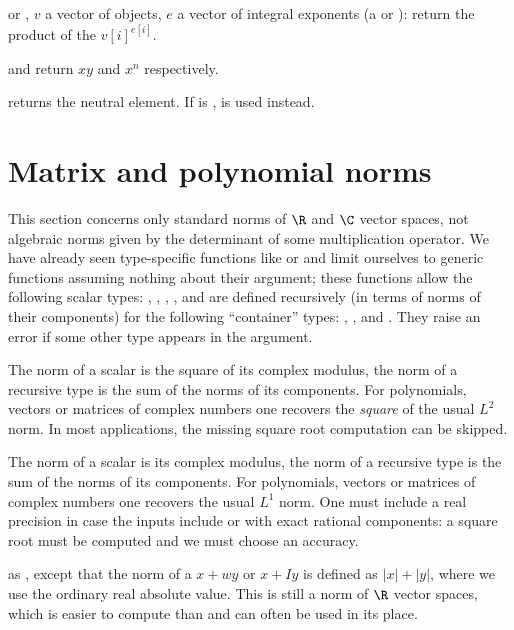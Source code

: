 \item or \kbd{[v, e]},  $v$ a vector of objects, $e$ a vector of integral
exponents (a  or ): return the product of the $v[i]^{e[i]}$.

\noindent {} and 
return $xy$ and $x^n$ respectively.

\noindent {} returns the neutral element. If  is ,
 is used instead.

\section{Matrix and polynomial norms} This section concerns only standard norms
of $\R$ and $\C$ vector spaces, not algebraic norms given by the determinant of
some multiplication operator. We have already seen type-specific functions like
 or  and limit ourselves to generic functions
assuming nothing about their  argument; these functions allow
the following scalar types: , , , ,
 and are defined recursively (in terms of norms of their components)
for the following ``container'' types: , ,  and
. They raise an error if some other type appears in the argument.

 The norm of a scalar is the square of its complex
modulus, the norm of a recursive type is the sum of the norms of its components.
For polynomials, vectors or matrices of complex numbers one recovers the
\emph{square} of the usual $L^2$ norm. In most applications, the missing square
root computation can be skipped.

 The norm of a scalar is its complex
modulus, the norm of a recursive type is the sum of the norms of its components.
For polynomials, vectors or matrices of complex numbers one recovers
the usual $L^1$ norm. One must include a real precision  in case
the inputs include  or  with exact rational components:
a square root must be computed and we must choose an accuracy.

 as , except that the norm
of a  $x + wy$ or  $x + Iy$ is defined as
$|x| + |y|$, where we use the ordinary real absolute value. This is still a norm
of $\R$ vector spaces, which is easier to compute than
 and can often be used in its place.

